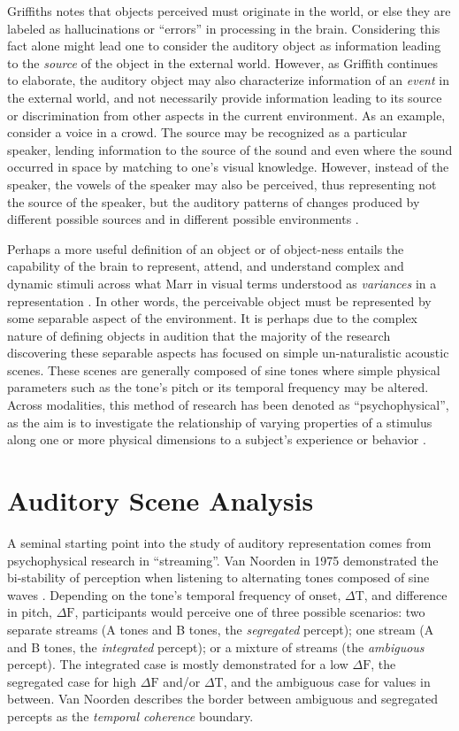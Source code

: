 \documentclass[a4paper,11pt,final]{ThesisStyle}
\begin{document}
Griffiths notes that objects perceived must originate in the world, or else they are labeled as hallucinations or ``errors'' in processing in the brain.  Considering this fact alone might lead one to consider the auditory object as information leading to the \textit{source} of the object in the external world.  However, as Griffith continues to elaborate, the auditory object may also characterize information of an \textit{event} in the external world, and not necessarily provide information leading to its source or discrimination from other aspects in the current environment.  As an example, consider a voice in a crowd.  The source may be recognized as a particular speaker, lending information to the source of the sound and even where the sound occurred in space by matching to one's visual knowledge.  However, instead of the speaker, the vowels of the speaker may also be perceived, thus representing not the source of the speaker, but the auditory patterns of changes produced by different possible sources and in different possible environments \cite{Griffiths2004}.  

Perhaps a more useful definition of an object or of object-ness entails the capability of the brain to represent, attend, and understand complex and dynamic stimuli across what Marr in visual terms understood as \textit{variances} in a representation \cite{Marr1982}.  In other words, the perceivable object must be represented by some separable aspect of the environment.   It is perhaps due to the complex nature of defining objects in audition that the majority of the research discovering these separable aspects has focused on simple un-naturalistic acoustic scenes.  These scenes are generally composed of sine tones where simple physical parameters such as the tone's pitch or its temporal frequency may be altered.  Across modalities, this method of research has been denoted as ``psychophysical'', as the aim is to investigate the relationship of varying properties of a stimulus along one or more physical dimensions to a subject's experience or behavior \cite{}. 

\section{Auditory Scene Analysis}

A seminal starting point into the study of auditory representation comes from psychophysical research in ``streaming''.  Van Noorden in 1975 demonstrated the bi-stability of perception when listening to alternating tones composed of sine waves \cite{Noorden1975}.  Depending on the tone's temporal frequency of onset, $\Delta \text{T}$, and difference in pitch, $\Delta \text{F}$, participants would perceive one of three possible scenarios: two separate streams (A tones and B tones, the \textit{segregated} percept); one stream (A and B tones, the \textit{integrated} percept); or a mixture of streams (the \textit{ambiguous} percept).  The integrated case is mostly demonstrated for a low $\Delta \text{F}$, the segregated case for high $\Delta \text{F}$ and/or $\Delta \text{T}$, and the ambiguous case for values in between.  Van Noorden describes the border between ambiguous and segregated percepts as the \textit{temporal coherence} boundary.  
\end{document}
